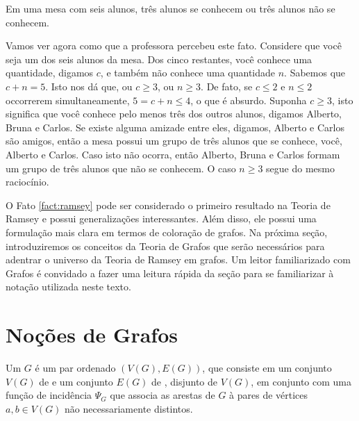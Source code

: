 \begin{fact} \label{fact:ramsey}
Em uma mesa com seis alunos, três alunos se conhecem ou três alunos não se conhecem.
\end{fact}

Vamos ver agora como que a professora percebeu este fato. Considere que você seja um dos seis alunos da mesa. Dos cinco restantes, você conhece uma quantidade, digamos $c$, e também não conhece uma quantidade $n$. Sabemos que $c + n = 5$. Isto nos dá que, ou $c \geq 3$, ou $n \geq 3$. De fato, se $c \leq 2$ e $n \leq 2$ occorrerem simultaneamente, $5 = c + n \leq 4$, o que é absurdo. Suponha $c \geq 3$, isto significa que você conhece pelo menos três dos outros alunos, digamos Alberto, Bruna e Carlos. Se existe alguma amizade entre eles, digamos, Alberto e Carlos são amigos, então a mesa possui um grupo de três alunos que se conhece, você, Alberto e Carlos. Caso isto não ocorra, então Alberto, Bruna e Carlos formam um grupo de três alunos que não se conhecem. O caso $n \geq 3$ segue do mesmo raciocínio.

O Fato \ref{fact:ramsey} pode ser considerado o primeiro resultado na Teoria de Ramsey e possui generalizações interessantes. Além disso, ele possui uma formulação mais clara em termos de coloração de grafos. Na próxima seção, introduziremos os conceitos da Teoria de Grafos que serão necessários para adentrar o universo da Teoria de Ramsey em grafos. Um leitor familiarizado com Grafos é convidado a fazer uma leitura rápida da seção para se familiarizar à notação utilizada neste texto.



\section{Noções de Grafos}

Um  $G$ é um par ordenado $(V(G), E(G))$, que consiste em um conjunto $V(G)$ de  e um conjunto $E(G)$ de , disjunto de $V(G)$, em conjunto com uma função de incidência $\Psi_G$ que associa as arestas de $G$ à pares de vértices $a,b \in V(G)$ não necessariamente distintos.

